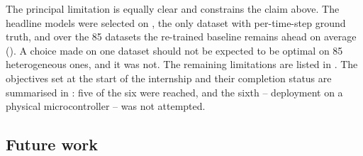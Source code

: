 The principal limitation is equally clear and constrains the claim above. The headline models were
selected on \webtraffic{}, the only dataset with per-time-step ground truth, and over the 85 \ucr{}
datasets the re-trained \millet{} baseline remains ahead on average (). A choice
made on one dataset should not be expected to be optimal on 85 heterogeneous ones, and it was not.
The remaining limitations are listed in . The objectives set at the start
of the internship and their completion status are summarised in : five of the
six were reached, and the sixth -- deployment on a physical microcontroller -- was not attempted.

\subsection{Future work}
\label{sec:future}

